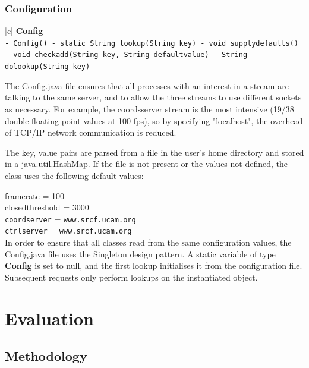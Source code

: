 \documentclass[12pt,a4,notitlepage]{report}
\renewcommand{\_}{\texttt{\symbol{95}}}
\newcommand{\<}{\texttt{\symbol{60}}}
\renewcommand{\>}{\texttt{\symbol{62}}}
\newcommand{\class}[1]{\textbf{#1}}
\newcommand{\variable}[1]{\texttt{#1}}
\begin{document}
{\subsection{Configuration}

\begin{tabular}{|c|} \hline 
\class{Config} \\ \hline
{}
{\variable{- Config() \newline
- static String lookup(String key) \newline
- void supply\_defaults() \newline
- void check\_add(String key, String defaultvalue) \newline
- String do\_lookup(String key)
} } \\ \hline
\end{tabular}

The Config.java file ensures that all processes with an interest in a stream are talking to the same server, and to allow the three streams to use different sockets as necessary. For example, the coordsserver stream is the most intensive (19/38 double floating point values at 100 fps), so by specifying "localhost", the overhead of TCP/IP network communication is reduced.

The \<key, value\> pairs are parsed from a file in the user's home directory and stored in a java.util.HashMap. If the file is not present or the values not defined, the class uses the following default values:

framerate = 100 \\
closedthreshold = 3000 \\
\variable{coordserver} = \verb^www.srcf.ucam.org^ \\
\variable{ctrlserver} = \verb^www.srcf.ucam.org^ \\

In order to ensure that all classes read from the same configuration values, the Config.java file uses the Singleton design pattern. A static variable of type \class{Config} is set to null, and the first lookup initialises it from the configuration file. Subsequent requests only perform lookups on the instantiated object.

\chapter{Evaluation}

\section{Methodology}

}
\end{document}
